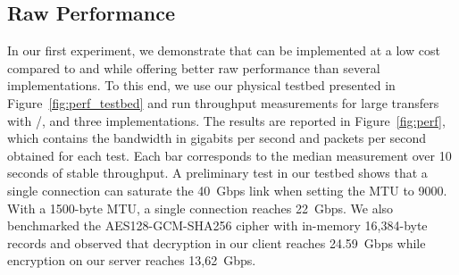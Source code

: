 



\subsection{Raw Performance} \label{sec:perf}
In our first experiment, we demonstrate that \tcpls can be implemented at a low 
cost compared to \tcp and \tls while offering better raw performance than 
several \quic implementations. To this end, we use our physical testbed 
presented in Figure~\ref{fig:perf_testbed} and run throughput measurements for 
large transfers with \tcp/\tls, \tcpls and three \quic implementations.
The results are reported in Figure~\ref{fig:perf}, which contains the bandwidth 
in gigabits per second and packets per second obtained for each test.
Each bar corresponds to the median measurement over 10 seconds of stable 
throughput.
A preliminary test in our testbed shows that a single \tcp connection can 
saturate the 40~Gbps link when setting the MTU to 9000. With a 1500-byte MTU, a 
single \tcp connection reaches 22~Gbps. We also benchmarked the 
AES128-GCM-SHA256 cipher with in-memory 16,384-byte \tls records and observed 
that decryption in our client reaches 24.59~Gbps while encryption on our 
server reaches 13,62~Gbps.


